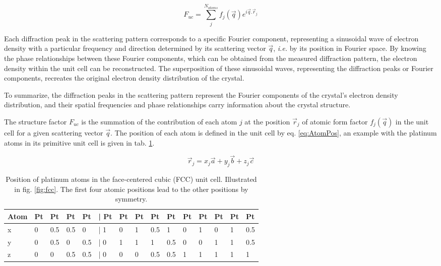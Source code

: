 \begin{equation}
    \label{eq:StrucFactor}
    F_{uc} = \sum_j^{N_{atoms}} f_j(\vec{q}) e^{i\vec{q}.\vec{r}_j}
\end{equation}

Each diffraction peak in the scattering pattern corresponds to a specific Fourier component, representing a sinusoidal wave of electron density with a particular frequency and direction determined by its scattering vector $\vec{q}$, \textit{i.e.} by its position in Fourier space.
By knowing the phase relationships between these Fourier components, which can be obtained from the measured diffraction pattern, the electron density within the unit cell can be reconstructed.
The superposition of these sinusoidal waves, representing the diffraction peaks or Fourier components, recreates the original electron density distribution of the crystal.

To summarize, the diffraction peaks in the scattering pattern represent the Fourier components of the crystal's electron density distribution, and their spatial frequencies and phase relationships carry information about the crystal structure.

The structure factor $F_{uc}$ is the summation of the contribution of each atom $j$ at the position $\vec{r}_j$ of atomic form factor $f_j(\vec{q})$ in the unit cell for a given scattering vector $\vec{q}$.
The position of each atom is defined in the unit cell by eq. \ref{eq:AtomPos}, an example with the platinum atoms in its primitive unit cell is given in tab. \ref{tab:PtAtoms}.

\begin{equation}
    \label{eq:AtomPos}
    \vec{r}_j = x_j\vec{a} + y_j\vec{b} + z_j\vec{c}
\end{equation}

\begin{table}[!htb]
    \centering
    \begin{tabular}{@{}lllllllllllllll@{}}
    \toprule
    Atom & Pt & Pt  & Pt  & Pt  & | Pt & Pt & Pt & Pt  & Pt  & Pt & Pt & Pt & Pt & Pt  \\ \midrule
    x    & 0  & 0.5 & 0.5 & 0   & | 1  & 0  & 1  & 0.5 & 1   & 0  & 1  & 0  & 1  & 0.5 \\
    y    & 0  & 0.5 & 0   & 0.5 & | 0  & 1  & 1  & 1   & 0.5 & 0  & 0  & 1  & 1  & 0.5 \\
    z    & 0  & 0   & 0.5 & 0.5 & | 0  & 0  & 0  & 0.5 & 0.5 & 1  & 1  & 1  & 1  & 1   \\ \bottomrule
    \end{tabular}
    \caption{Position of platinum atoms in the face-centered cubic (FCC) unit cell. Illustrated in fig. \ref{fig:fcc}. The first four atomic positions  lead to the other positions by symmetry.}
    \label{tab:PtAtoms}
\end{table}

